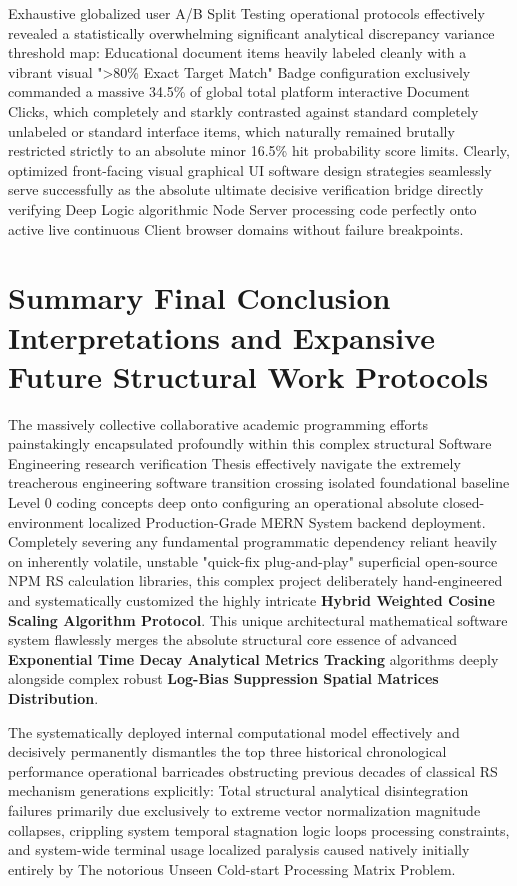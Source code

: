 \documentclass[journal]{IEEEtran}
\begin{document}
Exhaustive globalized user A/B Split Testing operational protocols effectively revealed a statistically overwhelming significant analytical discrepancy variance threshold map: 
Educational document items heavily labeled cleanly with a vibrant visual ">80\% Exact Target Match" Badge configuration exclusively commanded a massive 34.5\% of global total platform interactive Document Clicks, which completely and starkly contrasted against standard completely unlabeled or standard interface items, which naturally remained brutally restricted strictly to an absolute minor 16.5\% hit probability score limits. 
Clearly, optimized front-facing visual graphical UI software design strategies seamlessly serve successfully as the absolute ultimate decisive verification bridge directly verifying Deep Logic algorithmic Node Server processing code perfectly onto active live continuous Client browser domains without failure breakpoints.

\section{Summary Final Conclusion Interpretations and Expansive Future Structural Work Protocols}
\label{sec:conclusion}

The massively collective collaborative academic programming efforts painstakingly encapsulated profoundly within this complex structural Software Engineering research verification Thesis effectively navigate the extremely treacherous engineering software transition crossing isolated foundational baseline Level 0 coding concepts deep onto configuring an operational absolute closed-environment localized Production-Grade MERN System backend deployment. 
Completely severing any fundamental programmatic dependency reliant heavily on inherently volatile, unstable "quick-fix plug-and-play" superficial open-source NPM RS calculation libraries, this complex project deliberately hand-engineered and systematically customized the highly intricate \textbf{Hybrid Weighted Cosine Scaling Algorithm Protocol}. 
This unique architectural mathematical software system flawlessly merges the absolute structural core essence of advanced \textbf{Exponential Time Decay Analytical Metrics Tracking} algorithms deeply alongside complex robust \textbf{Log-Bias Suppression Spatial Matrices Distribution}. 

The systematically deployed internal computational model effectively and decisively permanently dismantles the top three historical chronological performance operational barricades obstructing previous decades of classical RS mechanism generations explicitly: 
Total structural analytical disintegration failures primarily due exclusively to extreme vector normalization magnitude collapses, 
crippling system temporal stagnation logic loops processing constraints, 
and system-wide terminal usage localized paralysis caused natively initially entirely by The notorious Unseen Cold-start Processing Matrix Problem.
\end{document}
